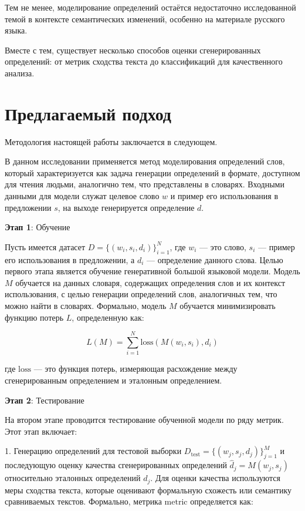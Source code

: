 \documentclass[LI,VKR]{HSEUniversity}
\begin{document}
Тем не менее, моделирование определений остаётся недостаточно исследованной темой
в контексте семантических изменений, особенно на материале русского языка.

Вместе с тем, существует несколько способов оценки сгенерированных определений:
от метрик сходства текста до классификаций для качественного анализа.

\chapter{Предлагаемый подход}

Методология настоящей работы заключается в следующем.

В данном исследовании применяется метод моделирования определений слов,
который характеризуется как задача генерации определений в формате,
доступном для чтения людьми, аналогично тем, что представлены в словарях.
Входными данными для модели служат целевое слово \( w \) и пример его использования в предложении \( s \),
на выходе генерируется определение \( d \).

\textbf{Этап 1}: Обучение

Пусть имеется датасет \( D = \{(w_i, s_i, d_i)\}_{i=1}^{N} \),
где \( w_i \) — это слово, \( s_i \) — пример его использования в предложении,
а \( d_i \) — определение данного слова.
Целью первого этапа является обучение генеративной большой языковой модели.
Модель \( M \) обучается на данных словаря, содержащих определения слов и их контекст использования,
с целью генерации определений слов, аналогичных тем, что можно найти в словарях.
Формально, модель \( M \) обучается минимизировать функцию потерь \( L \), определенную как:

\[
L(M) = \sum_{i=1}^{N} \text{loss}(M(w_i, s_i), d_i)
\]

где \(\text{loss}\) — это функция потерь,
измеряющая расхождение между сгенерированным определением и эталонным определением.

\textbf{Этап 2}: Тестирование

На втором этапе проводится тестирование обученной модели по ряду метрик.
Этот этап включает:

1. Генерацию определений для тестовой выборки \( D_{\text{test}} = \{(w_j, s_j, d_j)\}_{j=1}^{M} \)
и последующую оценку качества сгенерированных определений \( \hat{d}_j = M(w_j, s_j) \) относительно
эталонных определений \( d_j \).
Для оценки качества используются меры сходства текста, которые оценивают формальную схожесть или семантику сравниваемых текстов.
Формально, метрика \( \text{metric} \) определяется как:
\end{document}
